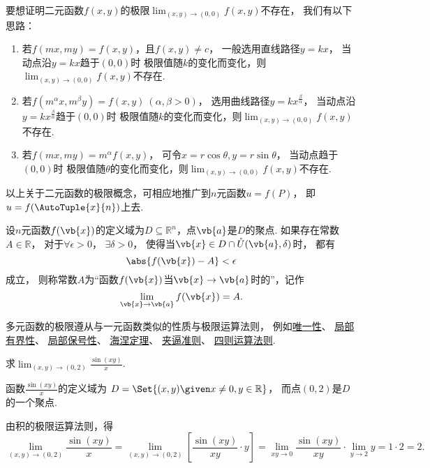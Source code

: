 \begin{remark}
要想证明二元函数\(f(x,y)\)的极限\(\lim_{(x,y)\to(0,0)} f(x,y)\)不存在，
我们有以下思路：
\begin{enumerate}
	\item 若\(f(mx,my) = f(x,y)\)，且\(f(x,y) \neq c\)，
	一般选用直线路径\(y=kx\)，
	当动点沿\(y=kx\)趋于\((0,0)\)时
	极限值随\(k\)的变化而变化，则\(\lim_{(x,y)\to(0,0)} f(x,y)\)不存在.

	\item 若\(f(m^\alpha x,m^\beta y) = f(x,y)\ (\alpha,\beta>0)\)，
	选用曲线路径\(y=kx^{\frac\beta\alpha}\)，
	当动点沿\(y=kx^{\frac\beta\alpha}\)趋于\((0,0)\)时
	极限值随\(k\)的变化而变化，则\(\lim_{(x,y)\to(0,0)} f(x,y)\)不存在.

	\item 若\(f(mx,my) = m^\alpha f(x,y)\)，
	可令\(x = r \cos\theta,y = r \sin\theta\)，
	当动点趋于\((0,0)\)时
	极限值随\(\theta\)的变化而变化，则\(\lim_{(x,y)\to(0,0)} f(x,y)\)不存在.
\end{enumerate}
\end{remark}

以上关于二元函数的极限概念，可相应地推广到\(n\)元函数\(u = f(P)\)，
即\(u = f(\AutoTuple{x}{n})\)上去.
\begin{definition}
设\(n\)元函数\(f(\vb{x})\)的定义域为\(D \subseteq \mathbb{R}^n\)，点\(\vb{a}\)是\(D\)的聚点.
如果存在常数\(A \in \mathbb{R}\)，
对于\(\forall\epsilon>0\)，
\(\exists\delta>0\)，
使得当\(\vb{x} \in D \cap \mathring{U}(\vb{a},\delta)\)时，
都有\begin{equation*}
	\abs{f(\vb{x}) - A} < \epsilon
\end{equation*}成立，
则称常数\(A\)为“函数\(f(\vb{x})\)当\(\vb{x}\to\vb{a}\)时的”，记作\begin{equation*}
	\lim_{\vb{x}\to\vb{a}} f(\vb{x}) = A.
\end{equation*}
\end{definition}

多元函数的极限遵从与一元函数类似的性质与极限运算法则，
例如\hyperref[theorem:极限.函数极限的唯一性]{唯一性}、
\hyperref[theorem:极限.函数极限的局部有界性]{局部有界性}、
\hyperref[theorem:极限.函数极限的局部保号性1]{局部保号性}、
\hyperref[theorem:极限.海涅定理]{海涅定理}、
\hyperref[theorem:函数极限.夹逼准则]{夹逼准则}、
\hyperref[theorem:极限.极限的四则运算法则]{四则运算法则}.

\begin{example}
求\(\lim_{(x,y)\to(0,2)} \frac{\sin(xy)}{x}\).
\begin{solution}
函数\(\frac{\sin(xy)}{x}\)的定义域为
\(D = \Set{ (x,y) \given x\neq0, y\in\mathbb{R} }\)，
而点\((0,2)\)是\(D\)的一个聚点.

由积的极限运算法则，得\begin{equation*}
	\lim_{(x,y)\to(0,2)} \frac{\sin(xy)}{x}
	= \lim_{(x,y)\to(0,2)} \left[ \frac{\sin(xy)}{xy} \cdot y \right]
	= \lim_{xy\to0} \frac{\sin(xy)}{xy} \cdot \lim_{y\to2} y
	= 1 \cdot 2 = 2.
\end{equation*}
\end{solution}
\end{example}

